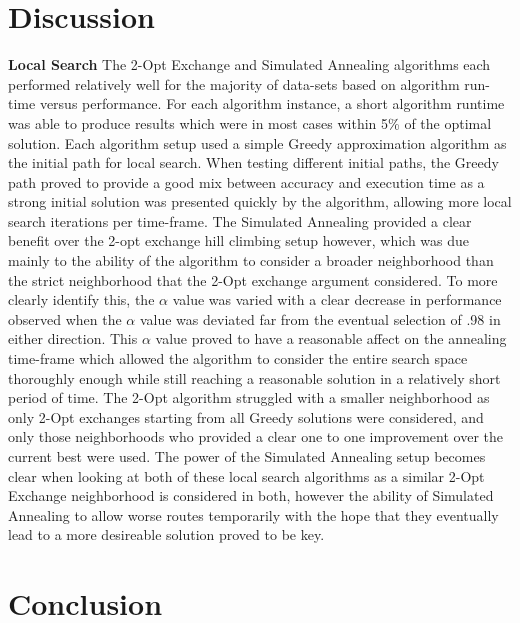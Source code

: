 \documentclass[format=sigconf]{acmart}
\begin{document}
\section*{Discussion}
\textbf{Local Search} The 2-Opt Exchange and Simulated Annealing algorithms each performed relatively 
well for the majority of data-sets based on algorithm run-time versus performance. For each algorithm instance, a short
algorithm runtime was able to produce results which were in most cases within 5\% of the optimal solution. Each algorithm setup 
used a simple Greedy approximation algorithm as the initial path for local search. When testing different initial paths, the Greedy path 
proved to provide a good mix between accuracy and execution time as a strong initial solution was presented quickly by the algorithm, allowing more local 
search iterations per time-frame. The Simulated Annealing 
provided a clear benefit over the 2-opt exchange hill climbing setup however, which was due mainly to the ability of the algorithm to consider 
a broader neighborhood than the strict neighborhood that the 2-Opt exchange argument considered. To more clearly identify this, the $\alpha$ value was 
varied with a clear decrease in performance observed when the $\alpha$ value was deviated far from the eventual selection of .98 in either direction. 
This $\alpha$ value proved to have a reasonable affect on the annealing time-frame which allowed the algorithm to consider the entire search space thoroughly enough 
while still reaching a reasonable solution in a relatively short period of time. The 2-Opt algorithm struggled with a smaller neighborhood as only 2-Opt exchanges starting from 
all Greedy solutions were considered, and only those neighborhoods who provided a clear one to one improvement over the current best were used. The power of the Simulated Annealing setup 
becomes clear when looking at both of these local search algorithms as a similar 2-Opt Exchange neighborhood is considered in both, however the ability of Simulated Annealing to 
allow worse routes temporarily with the hope that they eventually lead to a more desireable solution proved to be key.
\section*{Conclusion}


\end{document}
